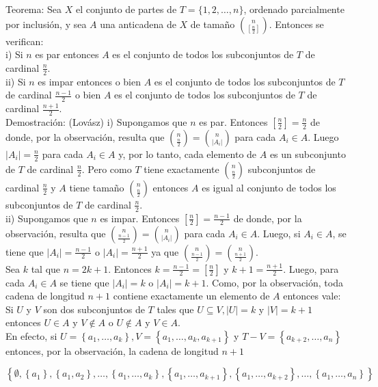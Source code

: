 \documentclass[10pt]{article}
\begin{document}
Teorema: Sea $X$ el conjunto de partes de $T=\{1,2, \ldots, n\}$, ordenado parcialmente por inclusión, y sea $A$ una anticadena de $X$ de tamaño $\binom{n}{\left[\frac{n}{2}\right]}$. Entonces se verifican:\\
i) Si $n$ es par entonces $A$ es el conjunto de todos los subconjuntos de $T$ de cardinal $\frac{n}{2}$.\\
ii) Si $n$ es impar entonces o bien $A$ es el conjunto de todos los subconjuntos de $T$ de cardinal $\frac{n-1}{2}$ o bien $A$ es el conjunto de todos los subconjuntos de $T$ de cardinal $\frac{n+1}{2}$.\\
Demostración: (Lovász) i) Supongamos que $n$ es par. Entonces $\left[\frac{n}{2}\right]=\frac{n}{2}$ de donde, por la observación, resulta que $\binom{n}{\frac{n}{2}}=\binom{n}{\left|A_{i}\right|}$ para cada $A_{i} \in A$. Luego $\left|A_{i}\right|=\frac{n}{2}$ para cada $A_{i} \in A$ y, por lo tanto, cada elemento de $A$ es un subconjunto de $T$ de cardinal $\frac{n}{2}$. Pero como $T$ tiene exactamente $\binom{n}{\frac{n}{2}}$ subconjuntos de cardinal $\frac{n}{2}$ y $A$ tiene tamaño $\binom{n}{\frac{n}{2}}$ entonces $A$ es igual al conjunto de todos los subconjuntos de $T$ de cardinal $\frac{n}{2}$.\\
ii) Supongamos que $n$ es impar. Entonces $\left[\frac{n}{2}\right]=\frac{n-1}{2}$ de donde, por la observación, resulta que $\binom{n}{\frac{n-1}{2}}=\binom{n}{\left|A_{i}\right|}$ para cada $A_{i} \in A$. Luego, si $A_{i} \in A$, se tiene que $\left|A_{i}\right|=\frac{n-1}{2}$ o $\left|A_{i}\right|=\frac{n+1}{2}$ ya que $\binom{n}{\frac{n-1}{2}}=\binom{n}{\frac{n+1}{2}}$.\\
Sea $k$ tal que $n=2 k+1$. Entonces $k=\frac{n-1}{2}=\left[\frac{n}{2}\right]$ y $k+1=\frac{n+1}{2}$. Luego, para cada $A_{i} \in A$ se tiene que $\left|A_{i}\right|=k$ o $\left|A_{i}\right|=k+1$. Como, por la observación, toda cadena de longitud $n+1$ contiene exactamente un elemento de $A$ entonces vale:\\
Si $U$ y $V$ son dos subconjuntos de $T$ tales que $U \subseteq V,|U|=k$ y $|V|=k+1$ entonces $U \in A$ y $V \notin A$ o $U \notin A$ y $V \in A$.\\
En efecto, si $U=\left\{a_{1}, \ldots, a_{k}\right\}, V=\left\{a_{1}, \ldots, a_{k}, a_{k+1}\right\}$ y $T-V=\left\{a_{k+2}, \ldots, a_{n}\right\}$ entonces, por la observación, la cadena de longitud $n+1$

$$
\left\{\emptyset,\left\{a_{1}\right\},\left\{a_{1}, a_{2}\right\}, \ldots,\left\{a_{1}, \ldots, a_{k}\right\},\left\{a_{1}, \ldots, a_{k+1}\right\},\left\{a_{1}, \ldots, a_{k+2}\right\}, \ldots,\left\{a_{1}, \ldots, a_{n}\right\}\right\}
$$
\end{document}
